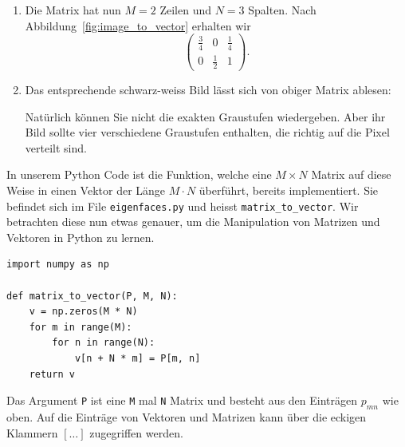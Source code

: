 \begin{losung}
	\begin{enumerate}[label=(\alph*)]
		\item Die Matrix hat nun $M=2$ Zeilen und $N=3$ Spalten. Nach Abbildung~\ref{fig:image_to_vector} erhalten wir
		\begin{equation*}
			\begin{pmatrix}
				\frac{3}{4} & 0 & \frac{1}{4} \\
				0 & \frac{1}{2} & 1
			\end{pmatrix}.
		\end{equation*}
		\item Das entsprechende schwarz-weiss Bild lässt sich von obiger Matrix ablesen:
		
		\begin{center}
		\end{center}

		Natürlich können Sie nicht die exakten Graustufen wiedergeben.
		Aber ihr Bild sollte vier verschiedene Graustufen enthalten, die richtig auf die Pixel verteilt sind.
	\end{enumerate}
\end{losung}
In unserem Python Code ist die Funktion, welche eine $M\times N$ Matrix auf diese Weise in einen Vektor der Länge $M\cdot N$ überführt, bereits implementiert.
Sie befindet sich im File \texttt{eigenfaces.py} und heisst \texttt{matrix\_to\_vector}.
Wir betrachten diese nun etwas genauer, um die Manipulation von Matrizen und Vektoren in Python zu lernen.
\begin{lstlisting}[style=python]
import numpy as np

def matrix_to_vector(P, M, N):
	v = np.zeros(M * N)
	for m in range(M):
		for n in range(N):
			v[n + N * m] = P[m, n]
	return v
\end{lstlisting}
Das Argument \texttt{P} ist eine \texttt{M} mal \texttt{N} Matrix und besteht aus den Einträgen $p_{mn}$ wie oben.
Auf die Einträge von Vektoren und Matrizen kann über die eckigen Klammern $[\ldots]$ zugegriffen werden.
